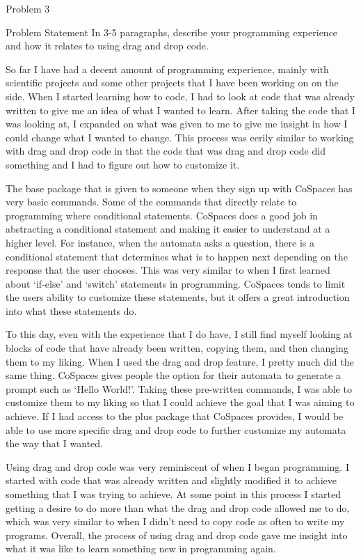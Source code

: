 \begin{problem}{Problem 3}
    \begin{statement}{Problem Statement}
        In 3-5 paragraphs, describe your programming experience and how it relates to using drag and drop code.
    \end{statement}

    \begin{highlight}[Response]
        So far I have had a decent amount of programming experience, mainly with scientific projects and some other projects that I have been working on on the side. When I started learning how to code, I had to
        look at code that was already written to give me an idea of what I wanted to learn. After taking the code that I was looking at, I expanded on what was given to me to give me insight in how I could change
        what I wanted to change. This process was eerily similar to working with drag and drop code in that the code that was drag and drop code did something and I had to figure out how to customize it.

        The base package that is given to someone when they sign up with CoSpaces has very basic commands. Some of the commands that directly relate to programming where conditional statements. CoSpaces does a good
        job in abstracting a conditional statement and making it easier to understand at a higher level. For instance, when the automata asks a question, there is a conditional statement that determines what is to 
        happen next depending on the response that the user chooses. This was very similar to when I first learned about `if-else' and `switch' statements in programming. CoSpaces tends to limit the users ability to
        customize these statements, but it offers a great introduction into what these statements do.

        To this day, even with the experience that I do have, I still find myself looking at blocks of code that have already been written, copying them, and then changing them to my liking. When I used the drag and
        drop feature, I pretty much did the same thing. CoSpaces gives people the option for their automata to generate a prompt such as `Hello World!'. Taking these pre-written commands, I was able to customize them
        to my liking so that I could achieve the goal that I was aiming to achieve. If I had access to the plus package that CoSpaces provides, I would be able to use more specific drag and drop code to further customize
        my automata the way that I wanted.

        Using drag and drop code was very reminiscent of when I began programming. I started with code that was already written and slightly modified it to achieve something that I was trying to achieve. At some point
        in this process I started getting a desire to do more than what the drag and drop code allowed me to do, which was very similar to when I didn't need to copy code as often to write my programs. Overall, the process
        of using drag and drop code gave me insight into what it was like to learn something new in programming again.
    \end{highlight}
\end{problem}

